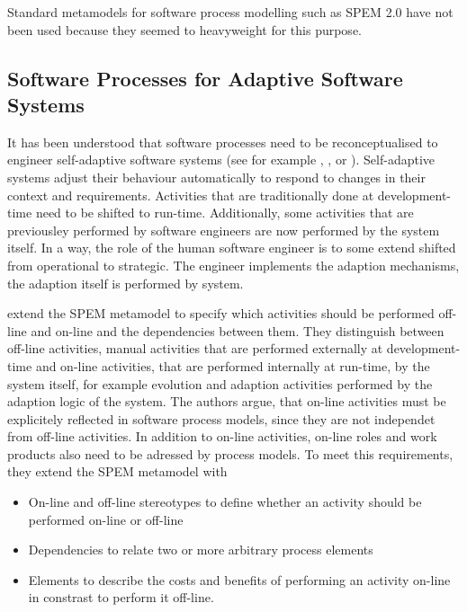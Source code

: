 Standard metamodels for software process modelling such as \ac{SPEM} 2.0 have not been used because they seemed to heavyweight for this purpose.

\subsection{Software Processes for Adaptive Software Systems}

It has been understood that software processes need to be reconceptualised to engineer self-adaptive software systems (see for example \cite{Blair:2009aa}, \cite{Inverardi:2008cz}, \cite{DeLemos:2013ty} or \cite{Andersson:2013aa}). Self-adaptive systems adjust their behaviour automatically to respond to changes in their context and requirements. Activities that are traditionally done at development-time need to be shifted to run-time. Additionally, some activities that are previousley performed by software engineers are now performed by the system itself. In a way, the role of the human software engineer is to some extend shifted from operational to strategic. The engineer implements the adaption mechanisms, the adaption itself is performed by system.

\cite{Andersson:2013aa} extend the \ac{SPEM} metamodel to specify which activities should be performed off-line and on-line and the dependencies between them.
They distinguish between off-line activities, manual activities that are performed externally at development-time and on-line activities, that are performed internally at run-time, by the system itself, for example evolution and adaption activities performed by the adaption logic of the system.
The authors argue, that on-line activities must be explicitely reflected in software process models, since they are not independet from off-line activities. In addition to on-line activities, on-line roles and work products also need to be adressed by process models. To meet this requirements, they extend the \ac{SPEM} metamodel with
\begin{itemize}
	\item On-line and off-line stereotypes to define whether an activity should be performed on-line or off-line
	\item Dependencies to relate two or more arbitrary process elements
	\item Elements to describe the costs and benefits of performing an activity on-line in constrast to perform it off-line.
\end{itemize}

